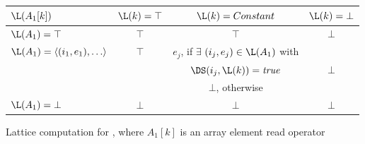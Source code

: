 



\begin{figure}%
\begin{center}
\begin{tabular}{|l||c|c|c|}
\hline
$\L(A_1[k])$ & $\L(k) = \top$ & $\L(k) = Constant$ & $\L(k) = \bot$ \\
\hline \hline
$\L(A_1) = \top$ & $\top$ & $\top$ & $\bot$ \\
\hline
$\L(A_1) = \langle (i_1,e_1), \ldots \rangle$ & $\top$ & $e_j$, 
if $\exists$
$(i_j,e_j) \in \L(A_1)$ with &\\
& & $\DS(i_j, \L(k)) = \mbox{\it true}$ & $\bot$\\
& & $\bot$, otherwise & \\
\hline
$\L(A_1) = \bot$ & $\bot$ & $\bot$ & $\bot$ \\
\hline
\end{tabular}
\end{center}
\caption{Lattice computation for ,
where $A_1[k]$ is an 
array element read operator}
\label{fig:aref}
\end{figure}

